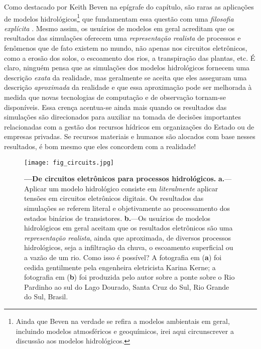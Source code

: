 \documentclass[./main.tex]{subfiles}
\begin{document}
\par Como destacado por Keith Beven na epígrafe do capítulo, são raras as aplicações de modelos hidrológicos\footnote{Ainda que Beven na verdade se refira a modelos ambientais em geral, incluindo modelos atmosféricos e geoquímicos, irei aqui circunscrever a discussão aos modelos hidrológicos.} que fundamentam essa questão com uma \textit{filosofia explícita} \cite{Beven2009}. Mesmo assim, os usuários de modelos em geral acreditam que os resultados das simulações oferecem uma \textit{representação realista} de processos e fenômenos que de fato existem no mundo, não apenas nos circuitos eletrônicos, como a erosão dos solos, o escoamento dos rios, a transpiração das plantas, etc. É claro, ninguém pensa que as simulações dos modelos hidrológicos fornecem uma descrição \textit{exata} da realidade, mas geralmente se aceita que eles asseguram uma descrição \textit{aproximada} da realidade e que essa aproximação pode ser melhorada à medida que novas tecnologias de computação e de observação tornam-se disponíveis. Essa crença acentua-se ainda mais quando os resultados das simulações são direcionados para auxiliar na tomada de decisões importantes relacionadas com a gestão dos recursos hídricos em organizações do Estado ou de empresas privadas. Se recursos materiais e humanos são alocados com base nesses resultados, é bom mesmo que eles concordem com a realidade! 

\begin{figure}[t!] %
	\centering				
	\texttt{[image: fig\_circuits.jpg]}		
	\caption[De circuitos eletrônicos para processos hidrológicos]
	{\textbf{---\;De circuitos eletrônicos para processos hidrológicos.}
        \;\textbf{a.}\;---\;Aplicar um modelo hidrológico consiste em \textit{literalmente} aplicar tensões em circuitos eletrônicos digitais. Os resultados das simulações se referem literal e objetivamente ao processamento dos estados binários de transistores. \;\textbf{b.}\;---\;Os usuários de modelos hidrológicos em geral aceitam que os resultados eletrônicos são uma \textit{representação realista}, ainda que aproximada, de diversos processos hidrológicos, seja a infiltração da chuva, o escoamento superficial ou a vazão de um rio. Como isso é possível? A fotografia em (\textbf{a}) foi cedida gentilmente pela engenheira eletricista Karina Kerne; a fotografia em (\textbf{b}) foi produzida pelo autor sobre a ponte sobre o Rio Pardinho ao sul do Lago Dourado, Santa Cruz do Sul, Rio Grande do Sul, Brasil.
	}
\label{fig:circuits}  %
\end{figure}
\end{document}
